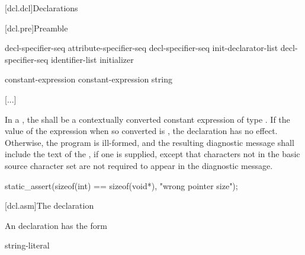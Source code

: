\documentclass{wg21}
\begin{document}


[dcl.dcl]{Declarations}%

[dcl.pre]{Preamble}

\begin{bnf}
    \br
    decl-specifier-seq  \terminal{;}\br
    attribute-specifier-seq decl-specifier-seq init-declarator-list \terminal{;}\br
     decl-specifier-seq  \terminal{[} identifier-list \terminal{]} initializer \terminal{;}
\end{bnf}

\begin{bnf}
    \br
     \terminal{(} constant-expression \terminal{)} \terminal{;}\br
     \terminal{(} constant-expression \terminal{,} string \terminal{)} \terminal{;}
\end{bnf}

[...]

\pnum
{}%
In a , the
 shall be
a contextually converted constant expression
of type .
If the value of the expression when
so converted is , the declaration has no
effect. Otherwise, the program is ill-formed, and the resulting
diagnostic message shall include the text of
the , if one is supplied,
except that characters not in the basic
source character set are not required to appear in
the diagnostic message.
\begin{example}
\begin{codeblock}
    static_assert(sizeof(int) == sizeof(void*), "wrong pointer size");
\end{codeblock}\end{example}

[dcl.asm]{The  declaration}%
%
%

\pnum
An  declaration has the form

\begin{bnf}
    \br
      \terminal{(} string-literal \terminal{)} \terminal{;}
\end{bnf}
\end{document}
